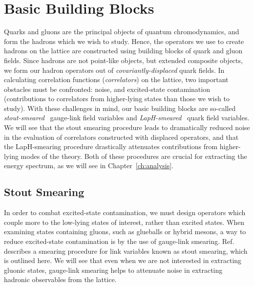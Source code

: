 \section{Basic Building Blocks}
    Quarks and gluons are the principal objects of quantum chromodynamics, and form the hadrons which we wish to study. Hence, the operators we use to create hadrons on the lattice are constructed using building blocks of quark and gluon fields. Since hadrons are not point-like objects, but extended composite objects, we form our hadron operators out of \textit{covariantly-displaced} quark fields. In calculating correlation functions (\emph{correlators}) on the lattice, two important obstacles must be confronted:  noise, and excited-state contamination (contributions to correlators from higher-lying states than those we wish to study). With these challenges in mind, our basic building blocks are so-called \textit{stout-smeared}~\cite{Morningstar:2003gk} gauge-link field variables and \textit{LapH-smeared}~\cite{Peardon:2009gh, Morningstar:2011ka} quark field variables. We will see that the stout smearing procedure leads to dramatically reduced noise in the evaluation of correlators constructed with displaced operators, and that the LapH-smearing procedure drastically attenuates contributions from higher-lying modes of the theory. Both of these procedures are crucial for extracting the energy spectrum, as we will see in Chapter~\ref{ch:analysis}.
    \subsection{Stout Smearing}
    In order to combat excited-state contamination, we must design operators which couple more to the low-lying states of interest, rather than excited states. When examining states containing gluons, such as glueballs or hybrid mesons, a way to reduce excited-state contamination is by the use of gauge-link smearing. Ref.~\cite{Morningstar:2003gk} describes a smearing procedure for link variables known as stout smearing, which is outlined here. We will see that even when we are not interested in extracting gluonic states, gauge-link smearing helps to attenuate noise in extracting hadronic observables from the lattice.
    
